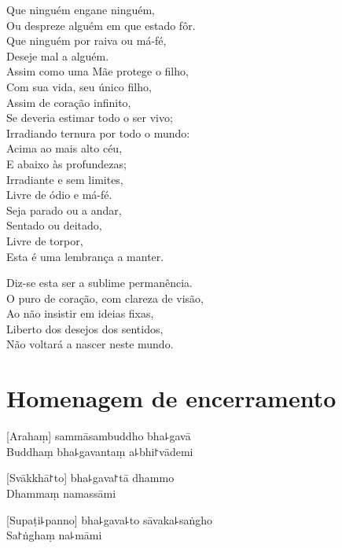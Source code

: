 \documentclass[
  babelLanguage=portuguese,
  final,
]{chantingbook}
\begin{document}
Que ninguém engane ninguém,\\
Ou despreze alguém em que estado fôr.\\
Que ninguém por raiva ou má-fé,\\
Deseje mal a alguém.\\
Assim como uma Mãe protege o filho,\\
Com sua vida, seu único filho,\\
Assim de coração infinito,\\
Se deveria estimar todo o ser vivo;\\
Irradiando ternura por todo o mundo:\\
Acima ao mais alto céu,\\
E abaixo às profundezas;\\
Irradiante e sem limites,\\
Livre de ódio e má-fé.\\
Seja parado ou a andar,\\
Sentado ou deitado,\\
Livre de torpor,\\
Esta é uma lembrança a manter.

Diz-se esta ser a sublime permanência.\\
O puro de coração, com clareza de visão,\\
Ao não insistir em ideias fixas,\\
Liberto dos desejos dos sentidos,\\
Não voltará a nascer neste mundo.

\artopttrue

\chapter{Homenagem de encerramento}

\enlargethispage{3\baselineskip}

[Arahaṃ] sammāsambuddho bha꜕gavā\\
Buddhaṃ bha꜕gavantaṃ a꜕bhi꜓vādemi

[Svākkhā꜓to] bha꜕gava꜓tā dhammo\\
Dhammaṃ namassāmi

[Supaṭi꜕panno] bha꜕gava꜕to sāvaka꜕saṅgho\\
Sa꜓ṅghaṃ na꜕māmi
\end{document}
